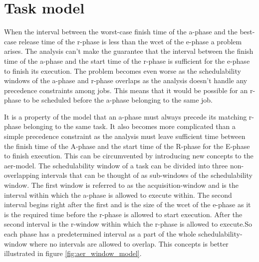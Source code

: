 \documentclass{kththesis}
\begin{document}
\section{Task model} \label{sec:work_task_model}

When the interval between the worst-case finish time of the \acrshort{a}-phase and the best-case
release time of the \acrshort{r}-phase is less than the \acrshort{wcet} of the \acrshort{e}-phase a
problem arises. The analysis can't make the guarantee that the interval between the finish time of
the \acrshort{a}-phase and the start time of the \acrshort{r}-phase is sufficient for the
\acrshort{e}-phase to finish its execution. The problem becomes even worse as the schedulability
windows of the \acrshort{a}-phase and \acrshort{r}-phase overlaps as the analysis doesn't handle any
precedence constraints among jobs. This means that it would be possible for an \acrshort{r}-phase
to be scheduled before the \acrshort{a}-phase belonging to the same job.

It is a property of the model that an \acrshort{a}-phase must always precede its matching
\acrshort{r}-phase belonging to the same task. It also becomes more complicated than a simple
precedence constraint as the analysis must leave sufficient time between the finish time of the
A-phase and the start time of the R-phase for the E-phase to finish execution. This can be
circumvented by introducing new concepts to the \acrshort{aer}-model. The schedulability window of a
task can be divided into three non-overlapping intervals that can be thought of as sub-windows of
the schedulability window. The first window is referred to as the acquisition-window and is the
interval within which the \acrshort{a}-phase is allowed to execute within. The second interval
begins right after the first and is the size of the \acrshort{wcet} of the \acrshort{e}-phase as it
is the required time before the \acrshort{r}-phase is allowed to start execution. After the second
interval is the \acrshort{r}-window within which the \acrshort{r}-phase is allowed to execute.So
each phase has a predetermined interval as a part of the whole schedulability-window where no
intervals are allowed to overlap. This concepts is better illustrated in figure
\ref{fig:aer_window_model}.
\end{document}

